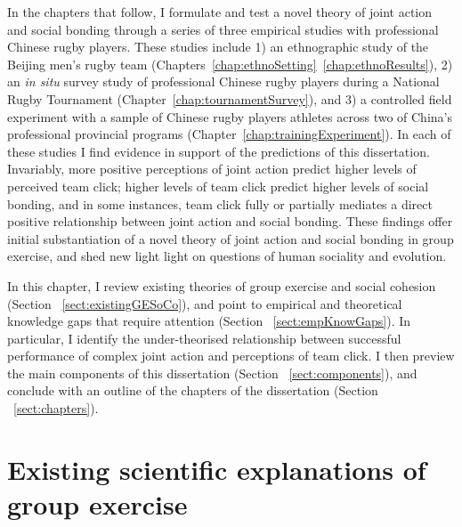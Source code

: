 \begin{CJK}{UTF8}{gbsn}

In the chapters that follow, I formulate and test a novel theory of joint action and social bonding through a series of three empirical studies with professional Chinese rugby players.  These studies include 1) an ethnographic study of the Beijing men's rugby team (Chapters~\ref{chap:ethnoSetting}\nobreakdash~\ref{chap:ethnoResults}), 2) an \textit{in situ} survey study of professional Chinese rugby players during a National Rugby Tournament (Chapter~\ref{chap:tournamentSurvey}), and 3) a controlled field experiment with a sample of Chinese rugby players athletes across two of China's professional provincial programs (Chapter~\ref{chap:trainingExperiment}).  In each of these studies I find evidence in support of the predictions of this dissertation.  Invariably, more positive perceptions of joint action predict higher levels of perceived team click; higher levels of team click predict higher levels of social bonding, and in some instances, team click fully or partially mediates a direct positive relationship between  joint action and social bonding.  These findings offer initial substantiation of a novel theory of joint action and social bonding in group exercise, and shed new light light on questions of human sociality and evolution.

In this chapter, I review existing theories of group exercise and social cohesion (Section ~\ref{sect:existingGESoCo}), and point to empirical and theoretical knowledge gaps that require attention (Section ~\ref{sect:empKnowGaps}).  In particular, I identify the under-theorised relationship between successful performance of complex joint action and perceptions of team click.  I then preview the main components of this dissertation (Section ~\ref{sect:components}), and conclude with an outline of the chapters of the dissertation (Section ~\ref{sect:chapters}).


\section{Existing scientific explanations of group exercise\label{sect:GESoCo}}


\end{CJK}
